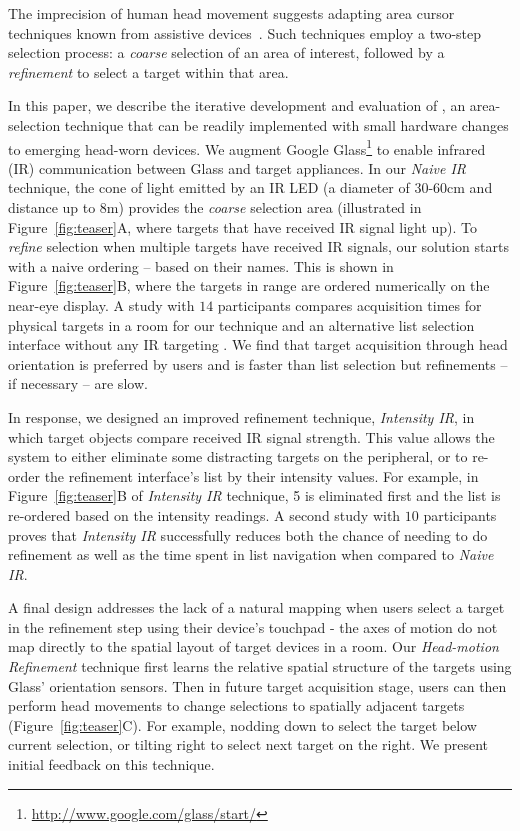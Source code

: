 The imprecision of human head movement suggests adapting area cursor techniques known from assistive devices~\cite{kabbash1995prince,worden1997making,findlater2010enhanced}. Such techniques employ a two-step selection process: a {\em coarse} selection of an area of interest, followed by a {\em refinement} to select a target within that area.

In this paper, we describe the iterative development and evaluation of \systemnamenospace, an area-selection technique that can be readily implemented with small hardware changes to emerging head-worn devices. We augment Google Glass\footnote{\url{http://www.google.com/glass/start/}} to enable infrared (IR) communication between Glass and target appliances. In our {\em Naive IR} technique, the cone of light emitted by an IR LED (a diameter of 30-60cm and distance up to 8m) provides the {\em coarse} selection area (illustrated in Figure~\ref{fig:teaser}A, where targets that have received IR signal light up). To {\em refine} selection when multiple targets have received IR signals, our solution starts with a naive ordering -- based on their names. This is shown in Figure~\ref{fig:teaser}B, where the targets in range are ordered numerically on the near-eye display. A study with $14$ participants compares acquisition times for physical targets in a room for our technique and an alternative list selection interface without any IR targeting  . We find that target acquisition through head orientation is preferred by users and is faster than list selection but refinements -- if necessary -- are slow.

In response, we designed an improved refinement technique, {\em Intensity IR}, in which target objects compare received IR signal strength. This value allows the system to either eliminate some distracting targets on the peripheral, or to re-order the refinement interface's list by their intensity values. For example, in Figure~\ref{fig:teaser}B of {\em Intensity IR} technique, 5 is eliminated first and the list is re-ordered based on the intensity readings. A second study with $10$ participants proves that {\em Intensity IR} successfully reduces both the chance of needing to do refinement as well as the time spent in list navigation when compared to {\em Naive IR}.

A final design addresses the lack of a natural mapping when users select a target in the refinement step using their device's touchpad - the axes of motion do not map directly to the spatial layout of target devices in a room. Our {\em Head-motion Refinement} technique first learns the relative spatial structure of the targets using Glass' orientation sensors. Then in future target acquisition stage, users can then perform head movements to change selections to spatially adjacent targets (Figure~\ref{fig:teaser}C). For example, nodding down to select the target below current selection, or tilting right to select next target on the right. We present initial feedback on this technique.

